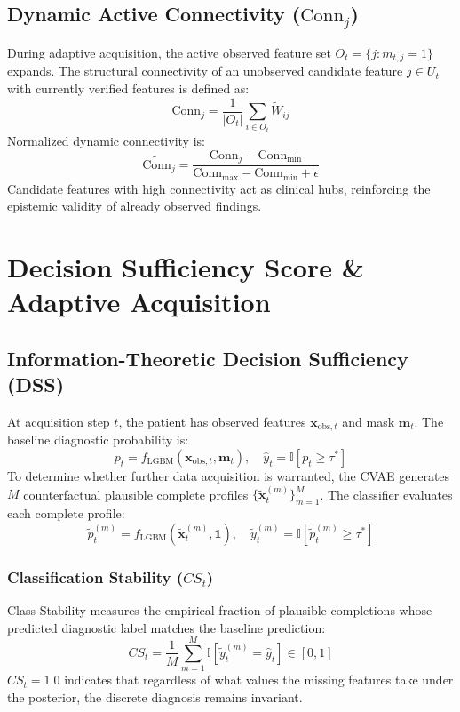 \documentclass[11pt,a4paper]{report}
\begin{document}
\section{Dynamic Active Connectivity ($\text{Conn}_j$)}
During adaptive acquisition, the active observed feature set $O_t = \{j : m_{t,j} = 1\}$ expands. The structural connectivity of an unobserved candidate feature $j \in U_t$ with currently verified features is defined as:
\begin{equation}
  \text{Conn}_j = \frac{1}{|O_t|} \sum_{i \in O_t} \widetilde{W}_{ij}
\end{equation}
Normalized dynamic connectivity is:
\begin{equation}
  \widetilde{\text{Conn}}_j = \frac{\text{Conn}_j - \text{Conn}_{\min}}{\text{Conn}_{\max} - \text{Conn}_{\min} + \epsilon}
\end{equation}
Candidate features with high connectivity act as clinical hubs, reinforcing the epistemic validity of already observed findings.

\chapter{Decision Sufficiency Score \& Adaptive Acquisition}

\section{Information-Theoretic Decision Sufficiency (DSS)}
At acquisition step $t$, the patient has observed features $\mathbf{x}_{\text{obs},t}$ and mask $\mathbf{m}_t$. The baseline diagnostic probability is:
\begin{equation}
  p_t = f_{\text{LGBM}}(\mathbf{x}_{\text{obs},t}, \mathbf{m}_t), \quad \hat{y}_t = \mathbb{I}[p_t \ge \tau^*]
\end{equation}
To determine whether further data acquisition is warranted, the CVAE generates $M$ counterfactual plausible complete profiles $\{\tilde{\mathbf{x}}_t^{(m)}\}_{m=1}^M$. The classifier evaluates each complete profile:
\begin{equation}
  \tilde{p}_t^{(m)} = f_{\text{LGBM}}(\tilde{\mathbf{x}}_t^{(m)}, \mathbf{1}), \quad \tilde{y}_t^{(m)} = \mathbb{I}[\tilde{p}_t^{(m)} \ge \tau^*]
\end{equation}

\subsection{Classification Stability ($CS_t$)}
Class Stability measures the empirical fraction of plausible completions whose predicted diagnostic label matches the baseline prediction:
\begin{equation}
  CS_t = \frac{1}{M} \sum_{m=1}^M \mathbb{I}\left[\tilde{y}_t^{(m)} = \hat{y}_t\right] \in [0, 1]
\end{equation}
$CS_t = 1.0$ indicates that regardless of what values the missing features take under the posterior, the discrete diagnosis remains invariant.
\end{document}
